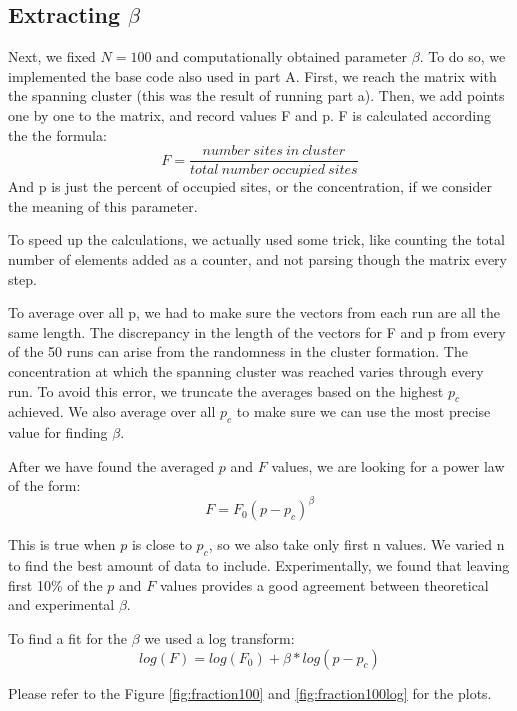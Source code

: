 \documentclass[12pt]{article}
\begin{document}
\subsection{Extracting $\beta$}
\label{sec:beta}
Next, we fixed $N=100$ and computationally obtained parameter $\beta$.
To do so, we implemented the base code also used in part A. First, we reach the matrix with the spanning cluster (this was the result of running part a). Then, we add points one by one to the matrix, and record values F and p. F is calculated according the the formula:
\begin{equation}
    F=\frac{number \ sites\ in\ cluster}{total\ number\ occupied\ sites}
\end{equation}
And p is just the percent of occupied sites, or the concentration, if we consider the meaning of this parameter.

To speed up the calculations, we actually used some trick, like counting the total number of elements added as a counter, and not parsing though the matrix every step.

To average over all p, we had to make sure the vectors from each run are all the same length. The discrepancy in the length of the vectors for F and p from every of the 50 runs can arise from the randomness in the cluster formation. The concentration at which the spanning cluster was reached varies through every run. To avoid this error, we truncate the averages based on the highest $p_c$ achieved. We also average over all $p_c$ to make sure we can use the most precise value for finding $\beta$.

After we have found the averaged $p$ and $F$ values, we are looking for a power law of the form:
\begin{equation}
    F=F_0(p-p_c)^\beta
\end{equation}

This is true when $p$ is close to $p_c$, so we also take only first n values. We varied n to find the best amount of data to include. Experimentally, we found that leaving first 10\% of the $p$ and $F$ values provides a good agreement between theoretical and experimental $\beta$.

To find a fit for the $\beta$ we used a log transform:
\begin{equation}
    log(F)=log(F_0)+\beta*log(p-p_c)
\end{equation}

Please refer to the Figure \ref{fig:fraction100} and \ref{fig:fraction100log} for the plots.
\end{document}
